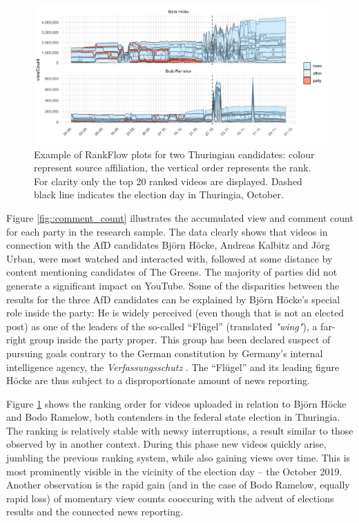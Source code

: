 \documentclass[sigchi, nonacm=true]{acmart}
\begin{document}
  \begin{figure}[t!]
    \centering
    \includegraphics[width=0.9\fulltextwidth]{plots/ranked_rameow_hoecke.png}

    \caption{Example of RankFlow plots for two Thuringian candidates: colour represent source affiliation, the vertical order represents the rank. For clarity only the top 20 ranked videos are displayed. Dashed black line indicates the election day in Thuringia,  October.}
    \label{fig::rankflows}
  \end{figure}

  Figure \ref{fig::comment_count} illustrates the accumulated view and comment count for each party in the research sample. The data clearly shows that videos in connection with the AfD candidates Bj\"orn H\"ocke, Andreas Kalbitz and J\"org Urban, were most watched and interacted with, followed at some distance by content mentioning candidates of The Greens. The majority of parties did not generate a significant impact on YouTube.
  Some of the disparities between the results for the three AfD candidates can be explained by Bj\"orn H\"ocke’s special role inside the party: He is widely perceived (even though that is not an elected post) as one of the leaders of the so-called “Fl\"ugel” (translated \textit{"wing"}), a far-right group inside the party proper. This group has been declared suspect of pursuing goals contrary to the German constitution by Germany’s internal intelligence agency, the \textit{Verfassungsschutz} \cite{bundesamt_fur_verfassungschutz_fachinformation_2019}. The “Fl\"ugel” and its leading figure H\"ocke are thus subject to a disproportionate amount of news reporting.

  Figure \ref{fig::rankflows} shows the ranking order for videos uploaded in relation to Bj\"orn H\"ocke and Bodo Ramelow, both contenders in the federal state election in Thuringia. The ranking is relatively stable with newsy interruptions, a result similar to those observed by \cite{rieder_ranking_2018} in another context. During this phase new videos quickly arise, jumbling the previous ranking system, while also gaining views over time. This is most prominently visible in the vicinity of the election day -- the  October 2019. Another observation is the rapid gain (and in the case of Bodo Ramelow, equally rapid loss) of momentary view counts cooccuring with the advent of elections results and the connected news reporting.
\end{document}
